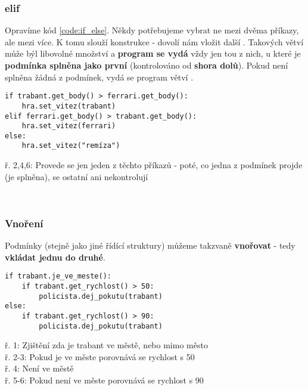 \subsubsection{elif}
Opravíme kód \ref{code:if_else}. Někdy potřebujeme vybrat ne mezi dvěma příkazy, ale mezi více. K tomu slouží konstrukce  - dovolí nám vložit další . Takových větví může býl libovolné množství a \textbf{program se vydá} vždy jen tou z nich, u které je \textbf{podmínka splněna jako první} (kontrolováno od \textbf{shora dolů}). Pokud není splněna žádná z podmínek, vydá se program větví .
\begin{minipage}[t]{.45\textwidth}
\begin{code}
\begin{verbatim}
if trabant.get_body() > ferrari.get_body():
	hra.set_vitez(trabant)
elif ferrari.get_body() > trabant.get_body():
	hra.set_vitez(ferrari)
else:
	hra.set_vitez("remíza")
\end{verbatim}

\label{code:if_elif_else}
\end{code}
\end{minipage}
\begin{minipage}[t]{.45\textwidth}
\vspace{1.5cm}
ř. 2,4,6:	Provede se jen jeden z těchto příkazů - poté, co jedna z podmínek projde (je splněna), se ostatní ani nekontrolují\\
\end{minipage}\\

\subsubsection{Vnoření}
Podmínky (stejně jako jiné řídící struktury) můžeme takzvaně \textbf{vnořovat} - tedy \textbf{vkládat jednu do druhé}.
\begin{minipage}[t]{.45\textwidth}
\begin{code}
\begin{verbatim}
if trabant.je_ve_meste():
	if trabant.get_rychlost() > 50:
		policista.dej_pokutu(trabant)
else:
	if trabant.get_rychlost() > 90:
		policista.dej_pokutu(trabant)
\end{verbatim}

\label{code:if_else_vnoreni}
\end{code}
\end{minipage}
\begin{minipage}[t]{.45\textwidth}
\vspace{2.5cm}
ř. 1:	Zjištění zda je trabant ve městě, nebo mimo město\\
ř. 2-3:	Pokud je ve měste porovnává se rychlost s 50\\
ř. 4:	Není ve městě\\
ř. 5-6:	Pokud není ve měste porovnává se rychlost s 90
\end{minipage}\\

